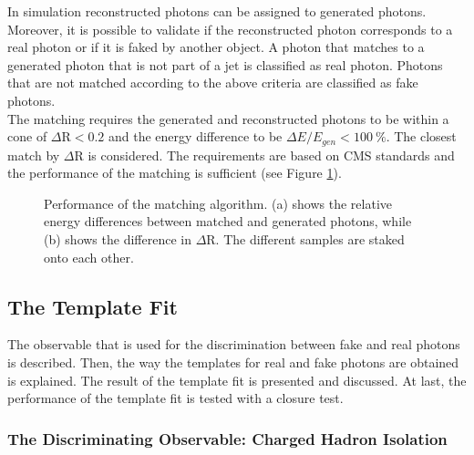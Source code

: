 In simulation reconstructed photons can be assigned to generated photons. Moreover, it is possible to validate if the reconstructed photon corresponds to a real photon or if it is faked by another object. A photon that matches to a generated photon that is not part of a jet is classified as real photon. Photons that are not matched according to the above criteria are classified as fake photons.\\
The matching requires the generated and reconstructed photons to be within a cone of $\Delta \mathrm{R} < 0.2$ and the energy difference to be $\Delta E / E_{gen} < \SI{100}{\percent}$. The closest match by $\Delta \mathrm{R}$ is considered. The requirements are based on CMS standards and the performance of the matching is sufficient (see Figure \ref{fig_ttg_match}).

\begin{figure}[ht]
  \caption{Performance of the matching algorithm. (a) shows the relative energy differences between matched and generated photons, while (b) shows the difference in $\Delta \mathrm{R}$. The different samples are staked onto each other.}
  \label{fig_ttg_match}
\end{figure}

\subsection{The Template Fit}
\label{sec_ttg_fit}

The observable that is used for the discrimination between fake and real photons is described. Then, the way the templates for real and fake photons are obtained is explained. The result of the template fit is presented and discussed. At last, the performance of the template fit is tested with a closure test. \\

\subsubsection{The Discriminating Observable: Charged Hadron Isolation}

